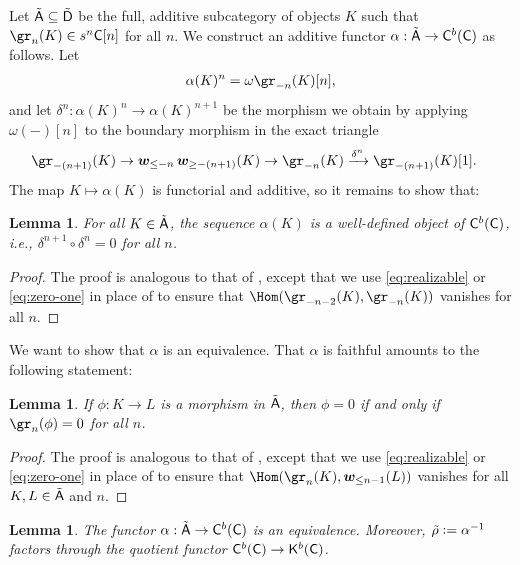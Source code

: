 \documentclass[a4paper,10pt,leqno]{amsart}
\theoremstyle{plain}
\theoremstyle{plain}
\theoremstyle{plain}
\newtheorem{lem}[thm]{Lemma}
\theoremstyle{definition}
\theoremstyle{remark}
\begin{document}
Let $\tilde{\sf{A}} \subseteq \tilde{\sf{D}}$ be the full, additive subcategory of objects $K$ such that $\gr_n(K) \in s^n \sf{C}[n]$ for all $n$.
We construct an additive functor $\alpha : \tilde{\sf{A}} \to \sf{C}^b(\sf{C})$ as follows.
Let
\begin{align}
\alpha(K)^n = \omega \gr_{-n}(K)[n],
\end{align}
and let $\delta^n : \alpha(K)^n \to \alpha(K)^{n + 1}$ be the morphism we obtain by applying $\omega(-)[n]$ to the boundary morphism in the exact triangle
\begin{align}\begin{split}
\gr_{-(n + 1)}(K)
\to \bm{w}_{\leq -n}\, \bm{w}_{\geq -(n + 1)}(K)
&\to \gr_{-n}(K)
\xrightarrow{\delta^n} \gr_{-(n + 1)} (K)[1].
\end{split}\end{align}
The map $K \mapsto \alpha(K)$ is functorial and additive, so it remains to show that:

\begin{lem}
For all $K \in \tilde{\sf{A}}$, the sequence $\alpha(K)$ is a well-defined object of $\sf{C}^b(\sf{C})$, \emph{i.e.}, $\delta^{n + 1} \circ \delta^n = 0$ for all $n$.
\end{lem}

\begin{proof}
The proof is analogous to that of \cite[Lem.\ 3.6]{rider}, except that we use \eqref{eq:realizable} or \eqref{eq:zero-one} in place of \cite[Lem.\ 2.4]{rider} to ensure that $\Hom(\gr_{-n - 2}(K), \gr_{-n}(K))$ vanishes for all $n$.
\end{proof}

We want to show that $\alpha$ is an equivalence.
That $\alpha$ is faithful amounts to the following statement:

\begin{lem}\label{lem:faithful}
If $\phi : K \to L$ is a morphism in $\tilde{\sf{A}}$, then $\phi = 0$ if and only if $\gr_n(\phi) = 0$ for all $n$.
\end{lem}

\begin{proof}
The proof is analogous to that of \cite[Lem.\ 3.5]{rider}, except that we use \eqref{eq:realizable} or \eqref{eq:zero-one} in place of \cite[Lem.\ 2.4]{rider} to ensure that $\Hom(\gr_n(K), \bm{w}_{\leq n - 1}(L))$ vanishes for all $K, L \in \tilde{\sf{A}}$ and $n$.
\end{proof}

\begin{lem}
The functor $\alpha : \tilde{\sf{A}} \to \sf{C}^b(\sf{C})$ is an equivalence.
Moreover, $\tilde{\rho} \vcentcolon= \alpha^{-1}$ factors through the quotient functor $\sf{C}^b(\sf{C}) \to \sf{K}^b(\sf{C})$.
\end{lem}
\end{document}
